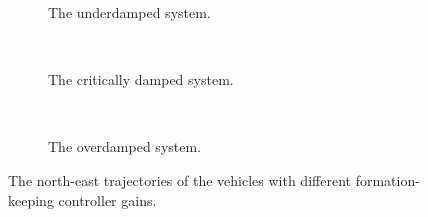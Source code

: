 \begin{figure}[htbp]
    \centering
    \begin{subfigure}[t]{.9\textwidth}
    \centering
    \setlength{}
    \setlength\figureheight{3.8cm}
    
    \vspace*{-4mm}
    \caption{The underdamped system.}
    \label{fig:underdamped_3d}
    \end{subfigure}
    \vspace*{-.9mm}
    \\
    \begin{subfigure}[t]{.9\textwidth}
    \centering
    \setlength{}
    \setlength\figureheight{3.8cm}
    
    \vspace*{-4mm}
    \caption{The critically damped system. }
    \label{fig:critically_damped_3d}
    \end{subfigure}
    \vspace*{-.9mm}
    \\
    \begin{subfigure}[t]{.9\textwidth}
    \centering
    \setlength{}
    \setlength\figureheight{3.8cm}
    
    \vspace*{-4mm}
    \caption{The overdamped system.}
    \label{fig:overdamped_3d}
    \end{subfigure}
    \vspace*{-3.5mm}
    \caption{The north-east trajectories of the vehicles with different formation-keeping controller gains.}
    \label{fig:formation_3d_dampings}
\end{figure}


